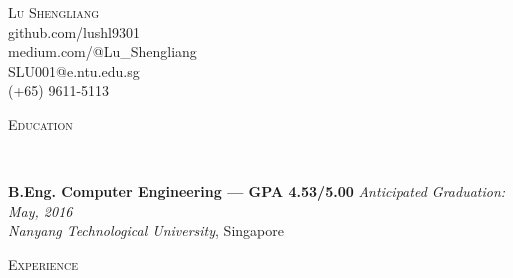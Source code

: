 \documentclass[a4paper, 12pt]{article}
\newenvironment{changemargin}[2]{%
  \begin{list}{}{%
      \setlength{\topsep}{0pt}%
      \setlength{\leftmargin}{#1}%
      \setlength{\rightmargin}{#2}%
      \setlength{\listparindent}{\parindent}%
      \setlength{\itemindent}{\parindent}%
      \setlength{\parsep}{\parskip}%
    }%
  \item[]}{\end{list}
}
\newcommand{\lineover}{
  \begin{changemargin}{-0.05in}{-0.05in}
    \vspace*{-8pt}
    \hrulefill \\
    \vspace*{-2pt}
  \end{changemargin}
}
\newcommand{\header}[1]{
  \begin{changemargin}{-0.5in}{-0.5in}
    \scshape{#1}\\
    \lineover
  \end{changemargin}
}
\newcommand{\contact}[5]{
  \begin{changemargin}{-0.5in}{-0.5in}
    \begin{center}
      {\Large \scshape {#1}}\\ \smallskip
      {#2}\\ \smallskip
      {#3}\\ \smallskip
      {#4}\\ \smallskip
      {#5}   \smallskip
    \end{center}
  \end{changemargin}
}
\newenvironment{body}
{
\vspace*{-16pt}
\begin{changemargin}{-0.25in}{-0.5in}
}	
{
\end{changemargin}
}
\begin{document}
\contact{Lu Shengliang}{github.com/lushl9301}{medium.com/@Lu\_Shengliang}{SLU001@e.ntu.edu.sg}{(+65) 9611-5113}





\header{Education}

\begin{body}
  \vspace{14pt}
  \textbf{B.Eng. Computer Engineering --- GPA 4.53/5.00} \hfill \emph{Anticipated Graduation: May, 2016} \\
  \emph{Nanyang Technological University}, Singapore\\
\end{body}


\smallskip
\medskip
\header{Experience}
\end{document}
